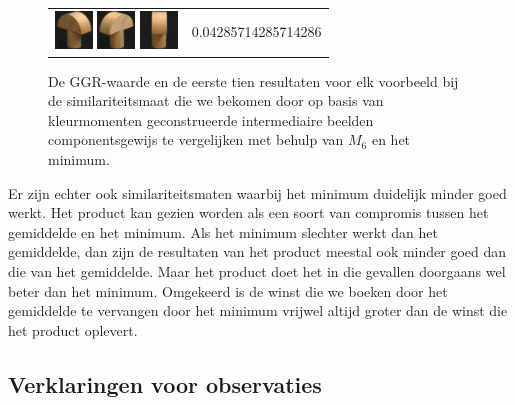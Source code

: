 {\begin{figure}[p]
\begin{tabular}{m{11cm} | m{3cm} |}
\includegraphics[width=1cm]{coil/beeld-4.eps}
\includegraphics[width=1cm]{coil/beeld-3.eps}
\includegraphics[width=1cm]{coil/beeld-5.eps}
& {\scriptsize 0.04285714285714286}
\\
\end{tabular}
\vspace{5pt}
\caption{\label{fig:results_beste_moments_comps_pixelgeb}De GGR-waarde en de eerste tien 
resultaten voor elk voorbeeld bij de similariteitsmaat die we 
bekomen door op basis van kleurmomenten geconstrueerde intermediaire beelden componentsgewijs 
te vergelijken met behulp van $M_{6}$ en het minimum.}
\end{figure}

\clearpage}

Er zijn echter ook similariteitsmaten waarbij het minimum
duidelijk minder goed werkt. Het product kan gezien worden als een soort van compromis
tussen het gemiddelde en het minimum. Als het minimum slechter werkt dan het gemiddelde,
dan zijn de resultaten van het product meestal ook minder goed dan die van het gemiddelde.
Maar het product doet het in die gevallen doorgaans wel beter dan het minimum. Omgekeerd
is de winst die we boeken door het gemiddelde te vervangen door het minimum vrijwel altijd
groter dan de winst die het product oplevert.

\subsection{Verklaringen voor observaties}

